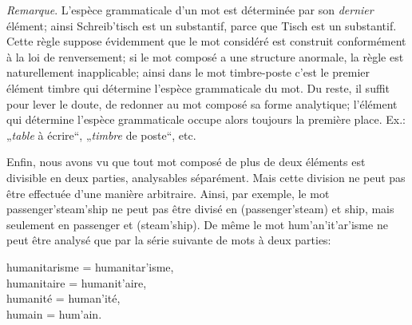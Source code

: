 {{      \emph{Remarque}. L’espèce grammaticale d’un mot est déterminée
      par son \emph{dernier} élément; ainsi \linebreak\textup{Schreib'tisch} est un substantif,
      parce que \textup{Tisch} est un substantif. Cette règle suppose
      évidemment que le mot considéré est construit conformément à la
      loi de renversement; si le mot composé a une structure anormale,
      la règle est naturellement inapplicable; ainsi dans le mot
      \textup{timbre-poste} c’est le premier élément \textup{timbre} qui détermine
      l’espèce grammaticale du mot. Du reste, il suffit pour lever le
      doute, de redonner au mot composé sa forme analytique;
      l’élément qui détermine l’espèce grammaticale occupe alors
      toujours la première place. Ex.: „\emph{table} à écrire“, „\emph{timbre} de
      poste“, etc.

      Enfin, nous avons vu que tout mot composé de plus de deux
      éléments est divisible en deux parties, analysables
      séparément. Mais cette division ne peut pas être effectuée d’une
      manière arbitraire. Ainsi, par exemple, le mot
      \textup{passenger'steam'ship} ne peut pas être divisé en
      (\textup{passenger'steam}) et \textup{ship}, mais seulement en
      \textup{passenger} et (\textup{steam'ship}). De même le mot
      \textup{hum'an'it'ar'isme} ne peut être analysé que par la série
      suivante de mots à deux parties:

      \begin{center}
        \textup{humanitarisme} = \textup{humanitar'isme},\\
        \textup{humanitaire} = \textup{humanit'aire},\\
        \textup{humanité} = \textup{human'ité},\\
        \textup{humain} = \textup{hum'ain}.
      \end{center}

    }


  }

